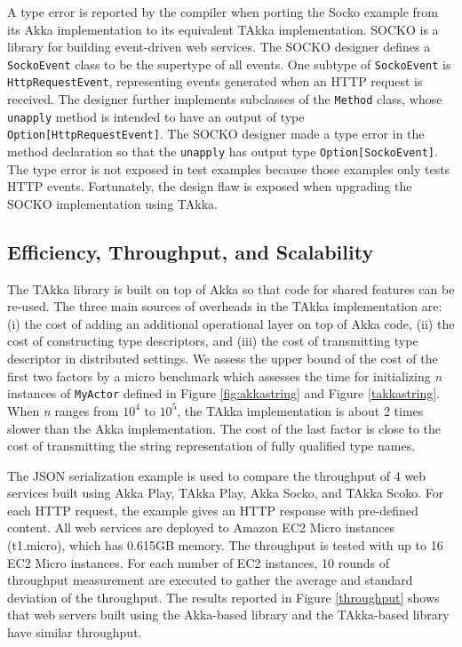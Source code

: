 A type error is reported by the compiler when porting the Socko example 
\citep{SOCKO} from its Akka implementation to its equivalent TAkka implementation.
SOCKO is a library for building event-driven web services.  The SOCKO designer
defines a {\tt SockoEvent} class to be the supertype of all events.  One
subtype of {\tt SockoEvent} is {\tt HttpRequestEvent}, representing events
generated when an HTTP request is received. The designer further implements
subclasses of the {\tt Method} class, whose {\tt unapply} method is intended to have an output
of type {\tt Option[HttpRequestEvent]}.  The SOCKO designer made a type error
in the method declaration so that the {\tt unapply} has output type {\tt Option[SockoEvent]}. 
The type error is not exposed in test examples because those examples only tests 
HTTP events. Fortunately, the design flaw is exposed when upgrading the SOCKO implementation 
using TAkka.



\subsection{Efficiency, Throughput, and Scalability}
\label{efficiency}

The TAkka library is built on top of Akka so that code for shared features 
can be re-used.  The three main sources of overheads in the TAkka implementation
are: (i) the cost of adding an additional operational layer on top of Akka 
code, (ii) the cost of constructing type descriptors, and (iii) the cost of 
transmitting type descriptor in distributed settings. We assess the upper bound 
of the cost of the first two factors by a micro benchmark which assesses the 
time for initializing {\it n} instances of {\tt MyActor} defined in Figure
\ref{fig:akkastring} and Figure \ref{takkastring}. When {\it n} ranges from 
$10^4$ to $10^5$, the TAkka implementation is about 2 times slower than
the Akka implementation.  The cost of the last factor is close to the cost of
transmitting the string representation of fully qualified type names.



The JSON serialization example \citep{techempower} is used to compare the 
throughput of 4 web services built using Akka Play, TAkka Play, Akka 
Socko, and TAkka Scoko.  For each HTTP request, the example gives an 
HTTP response with pre-defined content.  All web services are deployed to 
Amazon EC2 Micro instances (t1.micro), which has 0.615GB memory. The throughput 
is tested with up to 16 EC2 Micro instances.  For each number of EC2 instances, 
10 rounds of throughput measurement are executed to gather the average and 
standard deviation of the throughput. The results reported in Figure 
\ref{throughput} shows that web servers built using the Akka-based library and the
TAkka-based library have similar throughput.

